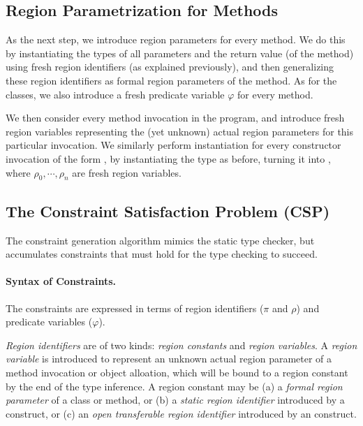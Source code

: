 \subsection{Region Parametrization for Methods}

As the next step, we introduce region parameters for every method.
We do this by instantiating the types of all parameters and the
return value (of the method) using fresh region identifiers (as explained previously),
and then generalizing these region identifiers as formal region parameters
of the method. As for the classes, we also introduce a fresh predicate variable
$\varphi$ for every method.

We then consider every method invocation in the program, and introduce
fresh region variables representing the (yet unknown) actual region
parameters for this particular invocation.
%
We similarly perform instantiation for every constructor invocation
of the form , by instantiating the type  as
before, turning it into ,
where $\rho_0, \cdots, \rho_n$ are fresh region variables.

\subsection{The Constraint Satisfaction Problem (CSP)}
\label{sec:fb-constraintsem}

The constraint generation algorithm mimics the static type checker, but accumulates
constraints that must hold for the type checking to succeed.

\paragraph{Syntax of Constraints.}
The constraints are expressed in terms of region identifiers ($\pi$ and $\rho$)
and predicate variables ($\varphi$).

\emph{Region identifiers} are of two kinds: \emph{region constants} and \emph{region variables}.
A \emph{region variable} is introduced to represent an unknown actual region parameter
of a method invocation or object alloation, which will be bound to a region constant by the end of the
type inference.
A region constant may be 
(a) a \emph{formal region parameter} of a class or method, or
(b) a \emph{static region identifier} introduced by a  construct, or
(c) an  \emph{open transferable region identifier} introduced by an  construct.

